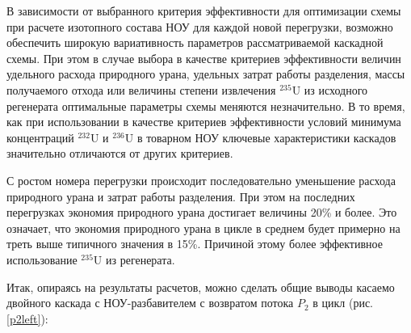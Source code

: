 В зависимости от выбранного критерия эффективности для оптимизации схемы при расчете изотопного состава НОУ для каждой новой перегрузки, возможно обеспечить широкую вариативность параметров рассматриваемой каскадной схемы. При этом в случае выбора в качестве критериев эффективности величин удельного расхода природного урана, удельных затрат работы разделения, массы получаемого отхода или величины степени извлечения $^{235}$U из исходного регенерата оптимальные параметры схемы меняются незначительно. В то время, как при использовании в качестве критериев эффективности условий минимума концентраций $^{232}$U и $^{236}$U в товарном НОУ ключевые характеристики каскадов значительно отличаются от других критериев.

С ростом номера перегрузки происходит последовательно уменьшение расхода природного урана и затрат работы разделения. При этом на последних перегрузках экономия природного урана достигает величины 20\% и более. Это означает, что экономия природного урана в цикле в среднем будет примерно на треть выше типичного значения в 15\%. Причиной этому более эффективное использование $^{235}$U из регенерата.


Итак, опираясь на результаты расчетов, можно сделать общие выводы касаемо двойного каскада с НОУ-разбавителем с возвратом потока $P_2$ в цикл (рис. \ref{p2left}):

